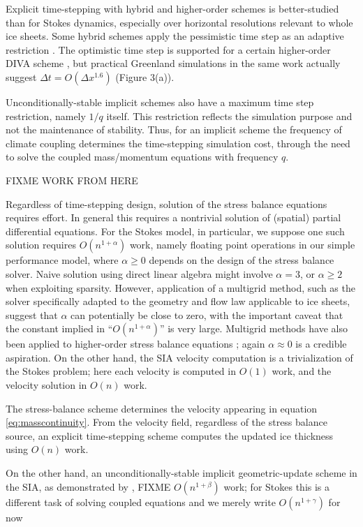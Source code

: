 \documentclass[twocolumn,letterpaper]{igs}
\begin{document}
Explicit time-stepping with hybrid and higher-order schemes is better-studied than for Stokes dynamics, especially over horizontal resolutions relevant to whole ice sheets.  Some hybrid schemes apply the pessimistic time step as an adaptive restriction \citep{Winkelmannetal2011}.  The optimistic time step is supported for a certain higher-order DIVA scheme \citep[see equation (52)]{Robinsonetal2022}, but practical Greenland simulations in the same work actually suggest $\Delta t = O(\Delta x^{1.6})$ (Figure 3(a)).

Unconditionally-stable implicit schemes also have a maximum time step restriction, namely $1/q$ itself.  This restriction reflects the simulation purpose and not the maintenance of stability.  Thus, for an implicit scheme the frequency of climate coupling determines the time-stepping simulation cost, through the need to solve the coupled mass/momentum equations with frequency $q$.

FIXME WORK FROM HERE

Regardless of time-stepping design, solution of the stress balance equations requires effort.  In general this requires a nontrivial solution of (spatial) partial differential equations.  For the Stokes model, in particular, we suppose one such solution requires $O(n^{1+\alpha})$ work, namely floating point operations in our simple performance model, where $\alpha\ge 0$ depends on the design of the stress balance solver.  Naive solution using direct linear algebra might involve $\alpha=3$, or $\alpha \ge 2$ when exploiting sparsity.  However, application of a multigrid method, such as the \cite{IsaacStadlerGhattas2015} solver specifically adapted to the geometry and flow law applicable to ice sheets, suggest that $\alpha$ can potentially be close to zero, with the important caveat that the constant implied in ``$O(n^{1+\alpha})$'' is very large.  Multigrid methods have also been applied to higher-order stress balance equations \citep{BrownSmithAhmadia2013}; again $\alpha \approx 0$ is a credible aspiration.  On the other hand, the SIA velocity computation is a trivialization of the Stokes problem; here each velocity is computed in $O(1)$ work, and the velocity solution in $O(n)$ work.

The stress-balance scheme determines the velocity appearing in equation \eqref{eq:masscontinuity}.  From the velocity field, regardless of the stress balance source, an explicit time-stepping scheme computes the updated ice thickness using $O(n)$ work.

On the other hand, an unconditionally-stable implicit geometric-update scheme in the SIA, as demonstrated by \cite{Bueler2016}, FIXME $O(n^{1+\beta})$ work; for Stokes this is a different task of solving coupled equations and we merely write $O(n^{1+\gamma})$ for now
\end{document}
